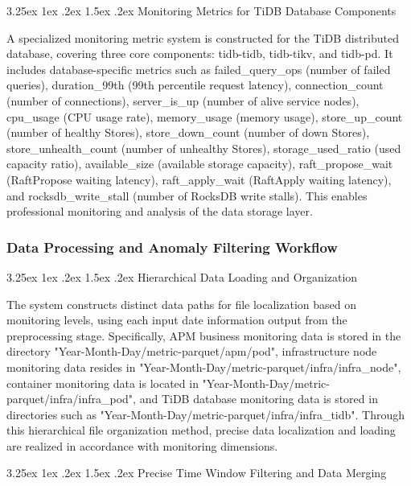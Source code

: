 \documentclass[10pt]{article}
\makeatletter
\renewcommand{\paragraph}{%
    \@startsection{paragraph}{4}{\z@}%
    {3.25ex \@plus1ex \@minus.2ex}%
    {1.5ex \@plus.2ex}%
    {\normalfont\normalsize\itshape}%
}
\makeatother
\begin{document}
\paragraph{Monitoring Metrics for TiDB Database Components}

A specialized monitoring metric system is constructed for the TiDB distributed database, covering three core components: tidb-tidb, tidb-tikv, and tidb-pd. It includes database-specific metrics such as failed\_query\_ops (number of failed queries), duration\_99th (99th percentile request latency), connection\_count (number of connections), server\_is\_up (number of alive service nodes), cpu\_usage (CPU usage rate), memory\_usage (memory usage), store\_up\_count (number of healthy Stores), store\_down\_count (number of down Stores), store\_unhealth\_count (number of unhealthy Stores), storage\_used\_ratio (used capacity ratio), available\_size (available storage capacity), raft\_propose\_wait (RaftPropose waiting latency), raft\_apply\_wait (RaftApply waiting latency), and rocksdb\_write\_stall (number of RocksDB write stalls). This enables professional monitoring and analysis of the data storage layer.

\subsubsection{Data Processing and Anomaly Filtering Workflow}

\paragraph{Hierarchical Data Loading and Organization}

The system constructs distinct data paths for file localization based on monitoring levels, using each input date information output from the preprocessing stage. Specifically, APM business monitoring data is stored in the directory "Year-Month-Day/metric-parquet/apm/pod", infrastructure node monitoring data resides in "Year-Month-Day/metric-parquet/infra/infra\_node", container monitoring data is located in "Year-Month-Day/metric-parquet/infra/infra\_pod", and TiDB database monitoring data is stored in directories such as "Year-Month-Day/metric-parquet/infra/infra\_tidb". Through this hierarchical file organization method, precise data localization and loading are realized in accordance with monitoring dimensions.

\paragraph{Precise Time Window Filtering and Data Merging}
\end{document}

